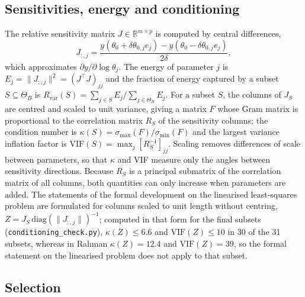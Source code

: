 \documentclass[pdflatex,sn-nature]{sn-jnl}
\theoremstyle{plain}
\begin{document}
\subsection*{Sensitivities, energy and conditioning}\label{met:sens}

The relative sensitivity matrix $J\in\mathbb{R}^{m\times p}$ is computed by central differences,
\begin{equation}
J_{:,j}=\frac{y(\theta_0+\delta\theta_{0,j}e_j)-y(\theta_0-\delta\theta_{0,j}e_j)}{2\delta},
\label{eq:jac}
\end{equation}
which approximates $\partial y/\partial\log\theta_j$. The energy of parameter $j$ is $E_j=\|J_{:,j}\|^2=(J^\top J)_{jj}$ and the fraction of energy captured by a subset $S\subseteq\Theta_B$ is $R_{\mathrm{var}}(S)=\sum_{j\in S}E_j/\sum_{j\in\Theta_B}E_j$. For a subset $S$, the columns of $J_S$ are centred and scaled to unit variance, giving a matrix $F$ whose Gram matrix is proportional to the correlation matrix $R_S$ of the sensitivity columns; the condition number is $\kappa(S)=\sigma_{\max}(F)/\sigma_{\min}(F)$ and the largest variance inflation factor is $\mathrm{VIF}(S)=\max_j[R_S^{-1}]_{jj}$\cite{bib5,bib9}. Scaling removes differences of scale between parameters, so that $\kappa$ and VIF measure only the angles between sensitivity directions. Because $R_S$ is a principal submatrix of the correlation matrix of all columns, both quantities can only increase when parameters are added. The statements of the formal development on the linearised least-squares problem are formulated for columns scaled to unit length without centring, $Z=J_S\,\mathrm{diag}(\|J_{:,j}\|)^{-1}$; computed in that form for the final subsets (\texttt{conditioning\_check.py}), $\kappa(Z)\le6.6$ and $\mathrm{VIF}(Z)\le10$ in 30 of the 31 subsets, whereas in Rahman $\kappa(Z)=12.4$ and $\mathrm{VIF}(Z)=39$, so the formal statement on the linearised problem does not apply to that subset.

\subsection*{Selection}\label{met:selection}
\end{document}

